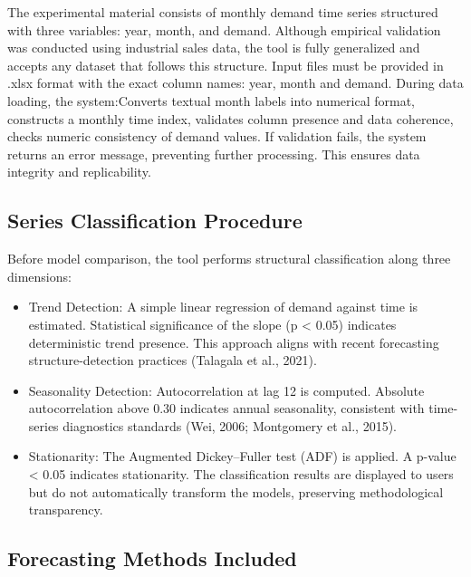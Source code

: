 \documentclass[journal,article,submit,pdftex,moreauthors]{Definitions/mdpi}
\begin{document}
The experimental material consists of monthly demand time series structured with three variables: year, month, and demand. Although empirical validation was conducted using industrial sales data, the tool is fully generalized and accepts any dataset that follows this structure.
Input files must be provided in .xlsx format with the exact column names: year, month and demand.
During data loading, the system:Converts textual month labels into numerical format,
constructs a monthly time index, validates column presence and data coherence, checks numeric consistency of demand values. If validation fails, the system returns an error message, preventing further processing. This ensures data integrity and replicability.

\subsection{Series Classification Procedure}

Before model comparison, the tool performs structural classification along three dimensions:
\begin{itemize}
\item Trend Detection:
A simple linear regression of demand against time is estimated. Statistical significance of the slope (p < 0.05) indicates deterministic trend presence. This approach aligns with recent forecasting structure-detection practices (Talagala et al., 2021).
\item Seasonality Detection:
Autocorrelation at lag 12 is computed. Absolute autocorrelation above 0.30 indicates annual seasonality, consistent with time-series diagnostics standards (Wei, 2006; Montgomery et al., 2015).
\item Stationarity:
The Augmented Dickey–Fuller test (ADF) is applied. A p-value < 0.05 indicates stationarity.
The classification results are displayed to users but do not automatically transform the models, preserving methodological transparency.
\end{itemize}

\subsection{Forecasting Methods Included}
\end{document}
